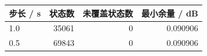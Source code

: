 \begin{tabular}{lrrr}
\toprule
步长 / s & 状态数 & 未覆盖状态数 & 最小余量 / dB \\
\midrule
1.0 & 35061 & 0 & 0.090906 \\
0.5 & 69843 & 0 & 0.090906 \\
\bottomrule
\end{tabular}
